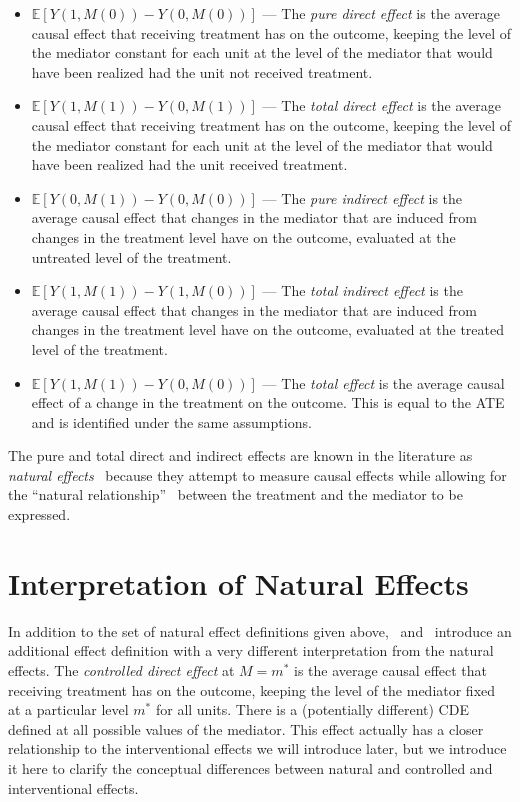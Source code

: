 \begin{itemize}[noitemsep,topsep=0pt]
	\item $\mathbb{E}[Y(1,M(0)) - Y(0,M(0))]$ --- The \textit{pure direct effect}
	is the average causal effect that receiving treatment has on the outcome, keeping the level of the mediator constant 
	for each unit at the level of the mediator that would have been realized had the unit not received treatment. 
	\item $\mathbb{E}[Y(1,M(1)) - Y(0,M(1))]$ --- The \textit{total direct effect}
	is the average causal effect that receiving treatment has on the outcome, keeping the level of the mediator constant 
	for each unit at the level of the mediator that would have been realized had the unit received treatment. 
	\item $\mathbb{E}[Y(0,M(1)) - Y(0,M(0))]$ --- The \textit{pure indirect effect}
	is the average causal effect that changes in the mediator that are induced from changes in the treatment level have
	on the outcome, evaluated at the untreated level of the treatment.  
	\item $\mathbb{E}[Y(1,M(1)) - Y(1,M(0))]$ --- The \textit{total indirect effect}
	is the average causal effect that changes in the mediator that are induced from changes in the treatment level have
	on the outcome, evaluated at the treated level of the treatment.  
	\item $\mathbb{E}[Y(1,M(1)) - Y(0,M(0))]$ --- The \textit{total effect} is 
	the average causal effect of a change in the treatment on the outcome. This is equal to the ATE and is identified
	under the same assumptions. 
\end{itemize}

The pure and total direct and indirect effects are known in the literature as 
\textit{natural effects}~\citep{robinsgreenland1992,pearl2001} because 
they attempt to measure causal effects while allowing for the ``natural relationship''~\citep{pearl2001} between the treatment 
and the mediator to be expressed.


\section{Interpretation of Natural Effects}\label{subsection:natural_effects_interpretation}

In addition to the set of natural effect definitions given above,~\cite{robinsgreenland1992} and~\cite{pearl2001} introduce an 
additional effect definition with a very different interpretation from the natural effects. The \textit{controlled direct effect}
at $M=m^{*}$ is the average causal effect that receiving treatment has on the outcome, keeping the level of the mediator fixed at a 
particular level $m^{*}$ for all units. There is a (potentially different) CDE defined at all possible values of the 
mediator. This effect actually has a closer relationship to the interventional effects we will introduce later, but we
introduce it here to clarify the conceptual differences between natural and controlled and interventional effects.

